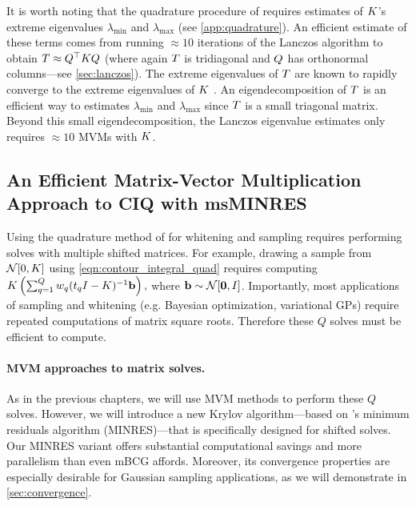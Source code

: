 It is worth noting that the quadrature procedure of  \citeauthor{hale2008computing} requires estimates of $K$'s extreme eigenvalues $\lambda_\text{min}$ and $\lambda_\text{max}$ (see \cref{app:quadrature}).
An efficient estimate of these terms comes from running $\approx 10$ iterations of the Lanczos algorithm to obtain $T \approx Q^\top K Q$ (where again $T$ is tridiagonal and $Q$ has orthonormal columns---see \cref{sec:lanczos}).
The extreme eigenvalues of $T$ are known to rapidly converge to the extreme eigenvalues of $K$ \citep[e.g.][Ch. 10]{golub2012matrix}.
An eigendecomposition of $T$ is an efficient way to estimates $\lambda_\text{min}$ and $\lambda_\text{max}$ since $T$ is a small triagonal matrix.
Beyond this small eigendecomposition, the Lanczos eigenvalue estimates only requires $\approx 10$ MVMs with $K$.




\subsection{An Efficient Matrix-Vector Multiplication Approach to CIQ with msMINRES}
%
Using the quadrature method of \citet{hale2008computing} for whitening and sampling requires performing solves with multiple shifted matrices.
For example, drawing a sample from $\normaldist{0}{\bK}$ using \cref{eqn:contour_integral_quad} requires computing
$K \left( \sum_{q=1}^Q w_q (t_q I - K )^{-1} \mathbf{b} \right),$
where $\bb \sim \normaldist{\bzero}{\bI}$.
Importantly, most applications of sampling and whitening (e.g. Bayesian optimization, variational GPs) require repeated computations of matrix square roots.
Therefore these $Q$ solves must be efficient to compute.

\paragraph{MVM approaches to matrix solves.}
As in the previous chapters, we will use MVM methods to perform these $Q$ solves.
However, we will introduce a new Krylov algorithm---based on \citet{paige1975solution}'s minimum residuals algorithm (MINRES)---that is specifically designed for shifted solves.
Our MINRES variant offers substantial computational savings and more parallelism than even mBCG affords.
Moreover, its convergence properties are especially desirable for Gaussian sampling applications, as we will demonstrate in \cref{sec:convergence}.


